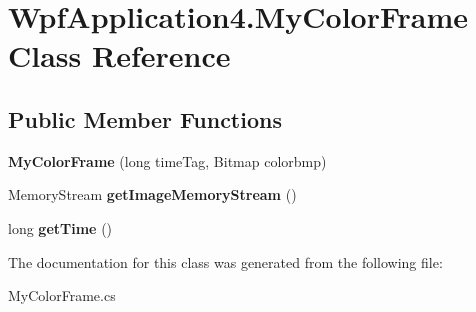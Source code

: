 \hypertarget{class_wpf_application4_1_1_my_color_frame}{\section{Wpf\-Application4.\-My\-Color\-Frame Class Reference}
\label{class_wpf_application4_1_1_my_color_frame}
}
\subsection*{Public Member Functions}
\begin{DoxyCompactItemize}
\item 
\hypertarget{class_wpf_application4_1_1_my_color_frame_a4e7694f2d9267a0881be22653335b332}{{\bfseries My\-Color\-Frame} (long time\-Tag, Bitmap colorbmp)}\label{class_wpf_application4_1_1_my_color_frame_a4e7694f2d9267a0881be22653335b332}

\item 
\hypertarget{class_wpf_application4_1_1_my_color_frame_a9b5e07ce697e9b2a7067c3b56bfe6306}{Memory\-Stream {\bfseries get\-Image\-Memory\-Stream} ()}\label{class_wpf_application4_1_1_my_color_frame_a9b5e07ce697e9b2a7067c3b56bfe6306}

\item 
\hypertarget{class_wpf_application4_1_1_my_color_frame_a1a24a2dc6ec2d164d614f646b63e17a6}{long {\bfseries get\-Time} ()}\label{class_wpf_application4_1_1_my_color_frame_a1a24a2dc6ec2d164d614f646b63e17a6}

\end{DoxyCompactItemize}


The documentation for this class was generated from the following file\-:\begin{DoxyCompactItemize}
\item 
My\-Color\-Frame.\-cs\end{DoxyCompactItemize}
